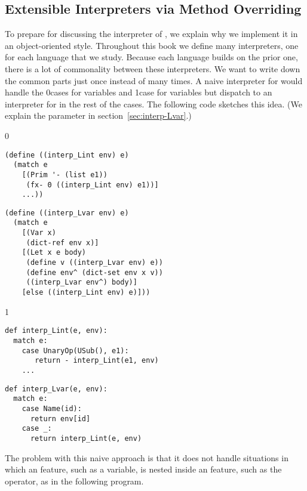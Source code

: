 \documentclass[7x10]{TimesAPriori_MIT}%
\def\racketEd{0}
\def\pythonEd{1}
\def\edition{1}
\newcommand{\racket}[1]{{\if\edition\racketEd{#1}\fi}}
\newcommand{\pythonColor}[0]{}
\newcommand{\python}[1]{{\if\edition\pythonEd\pythonColor #1\fi}}
\numberwithin{theorem}{chapter}
\numberwithin{definition}{chapter}
\numberwithin{equation}{chapter}
\begin{document}
\subsection{Extensible Interpreters via Method Overriding}
\label{sec:extensible-interp}

To prepare for discussing the interpreter of \LangVar{}, we explain
why we implement it in an object-oriented style. Throughout this book
we define many interpreters, one for each language that we
study. Because each language builds on the prior one, there is a lot
of commonality between these interpreters. We want to write down the
common parts just once instead of many times. A naive interpreter for
\LangVar{} would handle the \racket{cases for variables and
  }\python{case for variables} but dispatch to an
interpreter for \LangInt{} in the rest of the cases. The following
code sketches this idea. (We explain the  parameter in
section~\ref{sec:interp-Lvar}.)

\begin{center}
{\if\edition\racketEd  
\begin{minipage}{0.45\textwidth}
\begin{lstlisting}
(define ((interp_Lint env) e)
  (match e
    [(Prim '- (list e1))
     (fx- 0 ((interp_Lint env) e1))]
    ...))
\end{lstlisting}
\end{minipage}
\begin{minipage}{0.45\textwidth}
  \begin{lstlisting}
(define ((interp_Lvar env) e)
  (match e
    [(Var x)
     (dict-ref env x)]
    [(Let x e body)
     (define v ((interp_Lvar env) e))
     (define env^ (dict-set env x v))
     ((interp_Lvar env^) body)]
    [else ((interp_Lint env) e)]))    
\end{lstlisting}
\end{minipage}
\fi}

{\if\edition\pythonEd\pythonColor
\begin{minipage}{0.45\textwidth}
\begin{lstlisting}
def interp_Lint(e, env):
  match e:
    case UnaryOp(USub(), e1):
       return - interp_Lint(e1, env)
    ...
\end{lstlisting}
\end{minipage}
\begin{minipage}{0.45\textwidth}
\begin{lstlisting}
def interp_Lvar(e, env):
  match e:
    case Name(id):
      return env[id]
    case _:
      return interp_Lint(e, env)
\end{lstlisting}
\end{minipage}
\fi}
\end{center}
The problem with this naive approach is that it does not handle
situations in which an \LangVar{} feature, such as a variable, is
nested inside an \LangInt{} feature, such as the \code{-} operator, as
in the following program.
\end{document}
